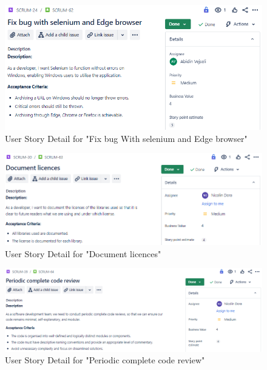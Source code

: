 \begin{figure}[h!]
    \centering
    \includegraphics[width=1\textwidth]{pictures/Scrum/Sprint 4/UserStory_18}
    \caption{User Story Detail for "Fix bug With selenium and Edge browser"}
    \label{fig:sprint_4_userstory_4}
\end{figure}
\begin{figure}[h!]
    \centering
    \includegraphics[width=1\textwidth]{pictures/Scrum/Sprint 4/UserStory_19}
    \caption{User Story Detail for "Document licences"}
    \label{fig:sprint_4_userstory_5}
\end{figure}
\begin{figure}[h!]
    \centering
    \includegraphics[width=1\textwidth]{pictures/Scrum/Sprint 4/UserStory_20}
    \caption{User Story Detail for "Periodic complete code review"}
    \label{fig:sprint_4_userstory_6}
\end{figure}
